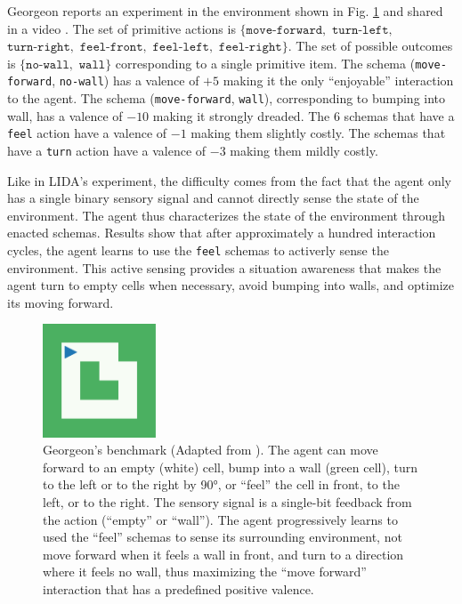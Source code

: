 \documentclass[runningheads]{llncs}
\begin{document}
Georgeon \cite{georgeon_intrinsically-motivated_2012} reports an experiment in the environment shown in Fig. \ref{fig:georgeon} and shared in a video \cite{georgeon_video_2012}.
The set of primitive actions is $\{ \texttt{move-forward},$ $\texttt{turn-left},$ $\texttt{turn-right},$ $\texttt{feel-front},$ $\texttt{feel-left},$ $\texttt{feel-right}\}$.
The set of possible outcomes is $\{ \texttt{no-wall},$ $ \texttt{wall} \}$ corresponding to a single primitive item. 
The schema (\texttt{move-forward}, \texttt{no-wall}) has a valence of $+5$ making it the only ``enjoyable'' interaction to the agent. 
The schema (\texttt{move-forward}, \texttt{wall}), corresponding to bumping into wall, has a valence of $-10$ making it strongly dreaded. 
The 6 schemas that have a \texttt{feel} action have a valence of $-1$ making them slightly costly. 
The schemas that have a \texttt{turn} action  have a valence of $-3$ making them mildly costly. 

Like in LIDA's experiment, the difficulty comes from the fact that the agent only has a single binary sensory signal and cannot directly sense the state of the environment. 
The agent thus characterizes the state of the environment through enacted schemas. 
Results show that after approximately a hundred interaction cycles, the agent learns to use the \texttt{feel} schemas to activerly sense the environment. 
This active sensing provides a situation awareness that makes the agent turn to empty cells when necessary, avoid bumping into walls, and optimize its moving forward. 

\begin{figure}
	\centering
	\includegraphics[width=0.3\textwidth]{Figure_grid_plot.pdf}
	\caption{Georgeon's benchmark (Adapted from \cite{georgeon_intrinsically-motivated_2012}).
		The agent can move forward to an empty (white) cell, bump into a wall (green cell), turn to the left or to the right by 90°, or ``feel'' the cell in front, to the left, or to the right. 
		The sensory signal is a single-bit feedback from the action (``empty'' or ``wall''). 	
		The agent progressively learns to used the ``feel'' schemas to sense its surrounding environment, not move forward when it feels a wall in front, and turn to a direction where it feels no wall, thus maximizing the ``move forward'' interaction that has a predefined positive valence.
	} 
	\label{fig:georgeon}
\end{figure}
\end{document}
